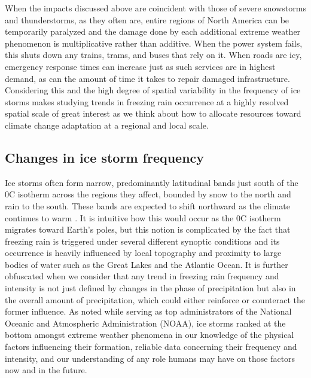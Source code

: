 \documentclass[twocol]{ametsoc}
\begin{document}
When the impacts discussed above are coincident with those of severe snowstorms and thunderstorms, as they often are, entire regions of North America can be temporarily paralyzed and the damage done by each additional extreme weather phenomenon is multiplicative rather than additive. When the power system fails, this shuts down any trains, trams, and buses that rely on it. When roads are icy, emergency response times can increase just as such services are in highest demand, as can the amount of time it takes to repair damaged infrastructure. Considering this and the high degree of spatial variability in the frequency of ice storms makes studying trends in freezing rain occurrence at a highly resolved spatial scale of great interest as we think about how to allocate resources toward climate change adaptation at a regional and local scale.

\subsection{Changes in ice storm frequency}
Ice storms often form narrow, predominantly latitudinal bands just south of the 0\degree C isotherm across the regions they affect, bounded by snow to the north and rain to the south. These bands are expected to shift northward as the climate continues to warm \citep{cheng2011possible,lambert2011simulated}. It is intuitive how this would occur as the 0\degree C isotherm migrates toward Earth's poles, but this notion is complicated by the fact that freezing rain is triggered under several different synoptic conditions and its occurrence is heavily influenced by local topography and proximity to large bodies of water such as the Great Lakes and the Atlantic Ocean. It is further obfuscated when we consider that any trend in freezing rain frequency and intensity is not just defined by changes in the phase of precipitation but also in the overall amount of precipitation, which could either reinforce or counteract the former influence. As \citet{lubchenco2012extreme} noted while serving as top administrators of the National Oceanic and Atmospheric Administration (NOAA), ice storms ranked at the bottom amongst extreme weather phenomena in our knowledge of the physical factors influencing their formation, reliable data concerning their frequency and intensity, and our understanding of any role humans may have on those factors now and in the future.
\end{document}
